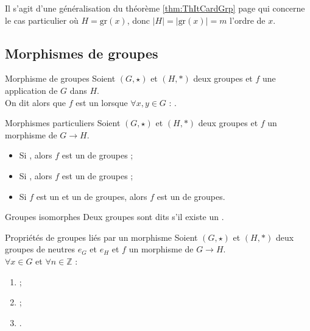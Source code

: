 \documentclass[12pt,a4paper]{report}
\begin{document}
    \begin{remarque}
    Il s'agit d'une généralisation du théorème \ref{thm:ThItCardGrp} page \pageref{thm:ThItCardGrp} qui concerne le cas particulier où $H = \text{gr}(x)$, donc $|H| = |\text{gr}(x)| = m$ l'ordre de $x$.
    \end{remarque}
    
    \pagebreak
    
    \subsection{Morphismes de groupes}
    
    \begin{definition}{Morphisme de groupes}{}
    Soient $(G, \star)$ et $(H, \ast)$ deux groupes et $f$ une application de $G$ dans $H$.\\
    On dit alors que $f$ est un  lorsque $\forall x, y \in G$ : .
    \end{definition}
    
    \begin{definition}{Morphismes particuliers}{}
    Soient $(G, \star)$ et $(H, \ast)$ deux groupes et $f$ un morphisme de $G \rightarrow H$.
    \begin{itemize}[label=$\cdot$]
        \item Si , alors $f$ est un  de groupes ;
        \item Si , alors $f$ est un  de groupes ;
        \item Si $f$ est un  et un  de groupes, alors $f$ est un  de groupes.
    \end{itemize}
    \end{definition}
    
    \begin{definition}{Groupes isomorphes}{}
    Deux groupes sont dits  s'il existe un .
    \end{definition}
    
    \begin{propositions}{Propriétés de groupes liés par un morphisme}{}
     Soient $(G, \star)$ et $(H, \ast)$ deux groupes de neutres $e_G$ et $e_H$ et $f$ un morphisme de $G \rightarrow H$.\\
     $\forall x \in G$ et $\forall n \in \mathbb{Z}$ :
    \begin{multicols}{3}
    \begin{enumerate}[label=\bfseries\arabic*)]
        \item\label{PorpGrpIsmrph1}  ;
        \item\label{PorpGrpIsmrph2}  ;
        \item\label{PorpGrpIsmrph3} .
    \end{enumerate}
    \end{multicols}
    \end{propositions}
    
\end{document}
